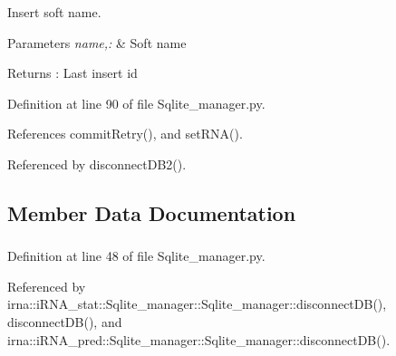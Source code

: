 \-Insert soft name. 


\begin{DoxyParams}{\-Parameters}
{\em name,\-:} & \-Soft name \\
\hline
\end{DoxyParams}
\begin{DoxyReturn}{\-Returns}
\-: \-Last insert id 
\end{DoxyReturn}


\-Definition at line 90 of file \-Sqlite\-\_\-manager.\-py.



\-References commit\-Retry(), and set\-R\-N\-A().



\-Referenced by disconnect\-D\-B2().



\subsection{\-Member \-Data \-Documentation}
\hypertarget{classirna_1_1David2tulip_1_1Sqlite__manager_1_1Sqlite__manager_a22f0a340297bcf1c7e711374b24b9b20}{
\subsubsection[{conn}]{}}
\label{classirna_1_1David2tulip_1_1Sqlite__manager_1_1Sqlite__manager_a22f0a340297bcf1c7e711374b24b9b20}


\-Definition at line 48 of file \-Sqlite\-\_\-manager.\-py.



\-Referenced by irna\-::i\-R\-N\-A\-\_\-stat\-::\-Sqlite\-\_\-manager\-::\-Sqlite\-\_\-manager\-::disconnect\-D\-B(), disconnect\-D\-B(), and irna\-::i\-R\-N\-A\-\_\-pred\-::\-Sqlite\-\_\-manager\-::\-Sqlite\-\_\-manager\-::disconnect\-D\-B().

\hypertarget{classirna_1_1David2tulip_1_1Sqlite__manager_1_1Sqlite__manager_a682dfb2f9b72bd08d421969da09be46e}{
\subsubsection[{conn2}]{}}
\label{classirna_1_1David2tulip_1_1Sqlite__manager_1_1Sqlite__manager_a682dfb2f9b72bd08d421969da09be46e}


